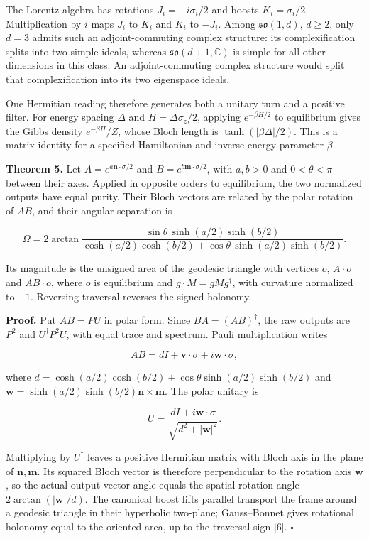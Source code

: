 \documentclass[
  11pt,
  a4paper,
]{article}
\begin{document}
The Lorentz algebra has rotations \(J_i=-i\sigma_i/2\) and boosts \(K_i=\sigma_i/2\). Multiplication by \(i\) maps \(J_i\) to \(K_i\) and \(K_i\) to \(-J_i\). Among \(\mathfrak{so}(1,d)\), \(d\ge2\), only \(d=3\) admits such an adjoint-commuting complex structure: its complexification splits into two simple ideals, whereas \(\mathfrak{so}(d+1,\mathbb C)\) is simple for all other dimensions in this class. An adjoint-commuting complex structure would split that complexification into its two eigenspace ideals.

One Hermitian reading therefore generates both a unitary turn and a positive filter. For energy spacing \(\Delta\) and \(H=\Delta\sigma_z/2\), applying \(e^{-\beta H/2}\) to equilibrium gives the Gibbs density \(e^{-\beta H}/Z\), whose Bloch length is \(\tanh(|\beta\Delta|/2)\). This is a matrix identity for a specified Hamiltonian and inverse-energy parameter \(\beta\).

\textbf{Theorem 5.} Let \(A=e^{a\mathbf n\cdot\sigma/2}\) and \(B=e^{b\mathbf m\cdot\sigma/2}\), with \(a,b>0\) and \(0<\theta<\pi\) between their axes. Applied in opposite orders to equilibrium, the two normalized outputs have equal purity. Their Bloch vectors are related by the polar rotation of \(AB\), and their angular separation is

\[\Omega=2\arctan
\frac{\sin\theta\,\sinh(a/2)\sinh(b/2)}
{\cosh(a/2)\cosh(b/2)+\cos\theta\,\sinh(a/2)\sinh(b/2)}.\]

Its magnitude is the unsigned area of the geodesic triangle with vertices \(o\), \(A\cdot o\) and \(AB\cdot o\), where \(o\) is equilibrium and \(g\cdot M=gMg^\dagger\), with curvature normalized to \(-1\). Reversing traversal reverses the signed holonomy.

\textbf{Proof.} Put \(AB=PU\) in polar form. Since \(BA=(AB)^\dagger\), the raw outputs are \(P^2\) and \(U^\dagger P^2U\), with equal trace and spectrum. Pauli multiplication writes

\[AB=dI+\mathbf v\cdot\sigma+i\mathbf w\cdot\sigma,\]

where \(d=\cosh(a/2)\cosh(b/2)+\cos\theta\sinh(a/2)\sinh(b/2)\) and \(\mathbf w=\sinh(a/2)\sinh(b/2)\mathbf n\times\mathbf m\). The polar unitary is

\[U=\frac{dI+i\mathbf w\cdot\sigma}{\sqrt{d^2+|\mathbf w|^2}}.\]

Multiplying by \(U^\dagger\) leaves a positive Hermitian matrix with Bloch axis in the plane of \(\mathbf n,\mathbf m\). Its squared Bloch vector is therefore perpendicular to the rotation axis \(\mathbf w\), so the actual output-vector angle equals the spatial rotation angle \(2\arctan(|\mathbf w|/d)\). The canonical boost lifts parallel transport the frame around a geodesic triangle in their hyperbolic two-plane; Gauss--Bonnet gives rotational holonomy equal to the oriented area, up to the traversal sign {[}6{]}. \(\square\)
\end{document}
